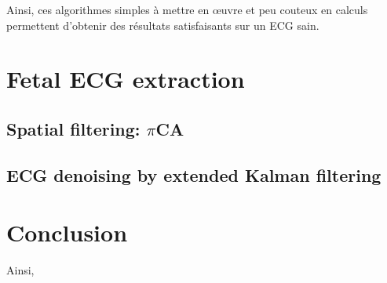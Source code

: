 \documentclass[12pt,a4paper,titlepage]{article}
\begin{document}
Ainsi, ces algorithmes simples à mettre en œuvre et peu couteux en calculs permettent 
d'obtenir des résultats satisfaisants sur un ECG sain.

\section{Fetal ECG extraction}

\subsection{Spatial filtering: $\pi$CA}

\subsection{ECG denoising by extended Kalman filtering}

\section*{Conclusion}

Ainsi,
\end{document}
